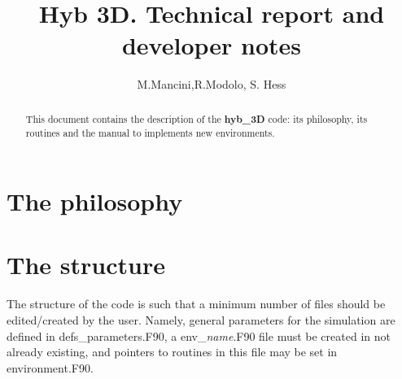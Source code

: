 \documentclass{article}
\author{M.Mancini,R.Modolo, S. Hess}
\title{Hyb 3D. Technical report and developer notes}
\begin{document}
\maketitle
\begin{abstract}
  This document contains the description of the \textbf{hyb\_3D}
  code: its philosophy, its routines and the manual to implements new
  environments.
\end{abstract}

\section{The philosophy}

\section{The structure}

The structure of the code is such that a minimum number of files should be edited/created by the user. Namely, general parameters for the simulation are defined in {\sf defs\_parameters.F90}, a {\sf env\_}{\it name}{\sf .F90} file must be created in not already existing, and pointers to routines in this file may be set in {\sf environment.F90}.
\end{document}
